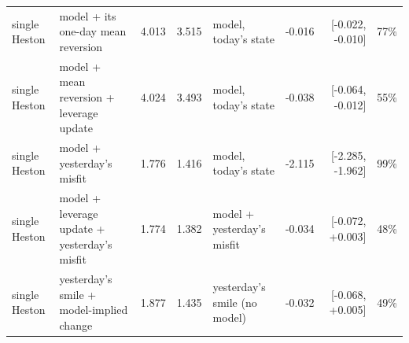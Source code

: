 \begin{table}[ht]
\begin{tabular}{llrrlrrr}
single Heston & model + its one-day mean reversion & 4.013 & 3.515 & model, today's state & -0.016 & [-0.022, -0.010] & 77\% \\
single Heston & model + mean reversion + leverage update & 4.024 & 3.493 & model, today's state & -0.038 & [-0.064, -0.012] & 55\% \\
single Heston & model + yesterday's misfit & 1.776 & 1.416 & model, today's state & -2.115 & [-2.285, -1.962] & 99\% \\
single Heston & model + leverage update + yesterday's misfit & 1.774 & 1.382 & model + yesterday's misfit & -0.034 & [-0.072, +0.003] & 48\% \\
single Heston & yesterday's smile + model-implied change & 1.877 & 1.435 & yesterday's smile (no model) & -0.032 & [-0.068, +0.005] & 49\% \\
\bottomrule
\end{tabular}
\par{}
\end{table}
